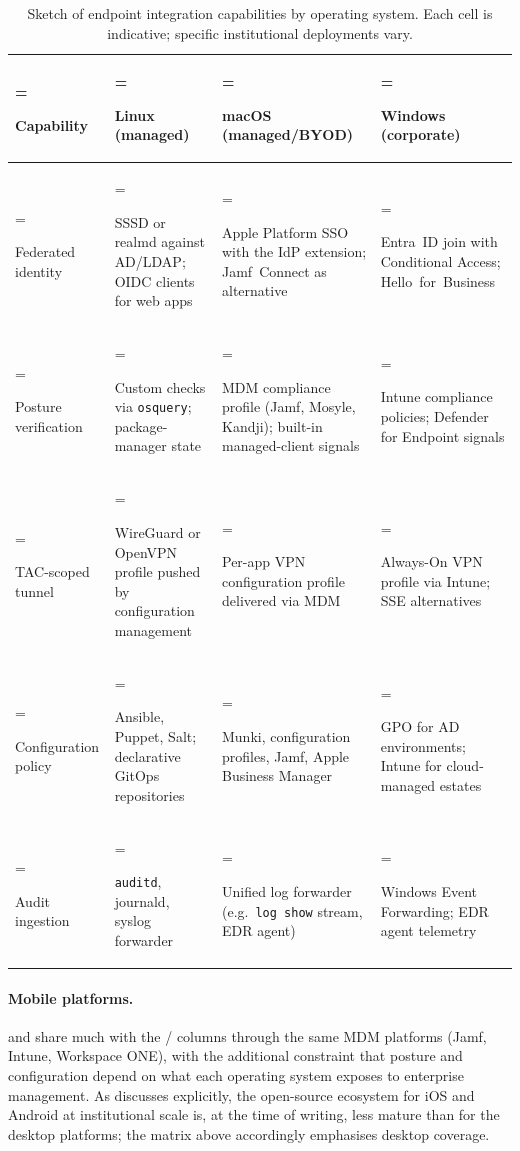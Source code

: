 \begin{table}[H]
\centering\small
\caption{Sketch of endpoint integration capabilities by operating
system. Each cell is indicative; specific institutional
deployments vary.}
\label{tab:cf-endpoint-matrix}
\begin{tabularx}{\textwidth}{%
  >{\hsize=0.9\hsize\linewidth=\hsize\bfseries\raggedright\arraybackslash}X%
  >{\hsize=1.0\hsize\linewidth=\hsize\raggedright\arraybackslash}X%
  >{\hsize=1.0\hsize\linewidth=\hsize\raggedright\arraybackslash}X%
  >{\hsize=1.1\hsize\linewidth=\hsize\raggedright\arraybackslash}X%
}
\toprule
Capability &
  \textbf{Linux (managed)} &
  \textbf{macOS (managed/BYOD)} &
  \textbf{Windows (corporate)} \\
\midrule
Federated identity &
  SSSD or realmd against AD/LDAP; OIDC clients for web apps &
  Apple Platform SSO with the IdP extension; Jamf~Connect as
  alternative &
  Entra~ID join with Conditional Access; Hello~for~Business \\
\addlinespace
Posture verification &
  Custom checks via \texttt{osquery}; package-manager state &
  MDM compliance profile (Jamf, Mosyle, Kandji); built-in
  managed-client signals &
  Intune compliance policies; Defender for Endpoint signals \\
\addlinespace
TAC-scoped tunnel &
  WireGuard or OpenVPN profile pushed by configuration management
  &
  Per-app VPN configuration profile delivered via MDM &
  Always-On VPN profile via Intune; SSE alternatives \\
\addlinespace
Configuration policy &
  Ansible, Puppet, Salt; declarative GitOps repositories &
  Munki, configuration profiles, Jamf, Apple Business Manager
  &
  GPO for AD environments; Intune for cloud-managed estates \\
\addlinespace
Audit ingestion &
  \texttt{auditd}, journald, syslog forwarder &
  Unified log forwarder (e.g.\ \texttt{log show} stream, EDR
  agent) &
  Windows Event Forwarding; EDR agent telemetry \\
\bottomrule
\end{tabularx}
\end{table}

\paragraph{Mobile platforms.}  and
 share much with the
/ columns through the
same MDM platforms (Jamf, Intune, Workspace ONE), with the
additional constraint that posture and configuration depend on
what each operating system exposes to enterprise management. As
 discusses explicitly, the open-source
ecosystem for iOS and Android at institutional scale is, at the
time of writing, less mature than for the desktop platforms; the
matrix above accordingly emphasises desktop coverage.

